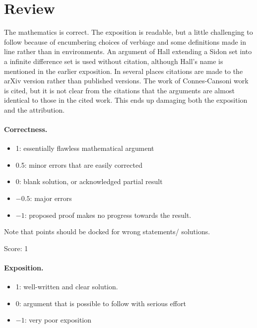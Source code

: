 \documentclass[11pt]{article}
\theoremstyle{remark}
\begin{document}
\maketitle

\section{Review}
{\color{gray} 


The mathematics is correct. The exposition is readable, but a little challenging to follow because of encumbering choices of verbiage and some definitions made in line rather than in environments. An argument of Hall extending a Sidon set into a infinite difference set is used without citation, although Hall's name is mentioned in the earlier exposition. In several places citations are made to the arXiv version rather than published versions. The work of Connes-Cansoni work is cited, but it is not clear from the citations that the arguments are almost identical to those in the cited work. This ends up damaging both the exposition and the attribution.}

\paragraph{Correctness.}
\begin{itemize}
	\item  1: essentially flawless mathematical argument
	\item  0.5: minor errors that are easily corrected
	\item  0: blank solution, or acknowledged partial result
	\item  $-0.5$: major errors
	\item  $-1$: proposed proof makes no progress towards the result.
\end{itemize}
Note that points should be docked for wrong statements/ solutions.

\noindent Score: 1

\paragraph{Exposition.}
\begin{itemize}
	\item  1: well-written and clear solution.
	\item  0: argument that is possible to follow with serious effort
	\item  $-1$: very poor exposition
\end{itemize}
\end{document}
